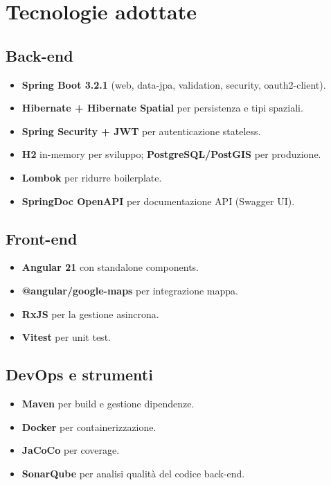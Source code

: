 \documentclass[a4paper,11pt]{report}
\begin{document}
\section{Tecnologie adottate}

\subsection{Back-end}

\begin{itemize}[nosep]
  \item \textbf{Spring Boot 3.2.1} (web, data-jpa, validation, security, oauth2-client).
  \item \textbf{Hibernate + Hibernate Spatial} per persistenza e tipi spaziali.
  \item \textbf{Spring Security + JWT} per autenticazione stateless.
  \item \textbf{H2} in-memory per sviluppo; \textbf{PostgreSQL/PostGIS} per produzione.
  \item \textbf{Lombok} per ridurre boilerplate.
  \item \textbf{SpringDoc OpenAPI} per documentazione API (Swagger UI).
\end{itemize}

\subsection{Front-end}

\begin{itemize}[nosep]
  \item \textbf{Angular 21} con standalone components.
  \item \textbf{@angular/google-maps} per integrazione mappa.
  \item \textbf{RxJS} per la gestione asincrona.
  \item \textbf{Vitest} per unit test.
\end{itemize}

\subsection{DevOps e strumenti}

\begin{itemize}[nosep]
  \item \textbf{Maven} per build e gestione dipendenze.
  \item \textbf{Docker} per containerizzazione.
  \item \textbf{JaCoCo} per coverage.
  \item \textbf{SonarQube} per analisi qualità del codice back-end.
\end{itemize}
\end{document}
